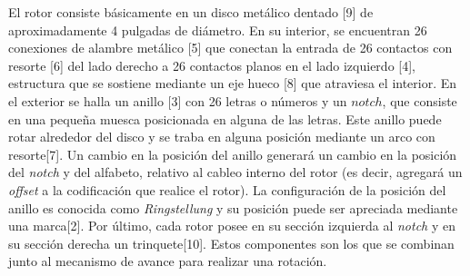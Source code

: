 \documentclass[a4paper,10pt]{article}
\begin{document}
El rotor consiste básicamente en un disco metálico dentado [9] de aproximadamente 4 pulgadas de diámetro. En su interior, se encuentran 26 conexiones de alambre metálico [5] que conectan la entrada de 26 contactos con resorte [6] del lado derecho a 26 contactos planos en el lado izquierdo [4], estructura que se sostiene mediante un eje hueco [8] que atraviesa el interior. En el exterior se halla un anillo [3] con 26 letras o números y un $notch$, que consiste en una pequeña muesca posicionada en alguna de las letras. Este anillo puede rotar alrededor del disco y se traba en alguna posición mediante un arco con resorte[7]. Un cambio en la posición del anillo generará un cambio en la posición del \textit{notch} y del alfabeto, relativo al cableo interno del rotor (es decir, agregará un \textit{offset} a la codificación que realice el rotor). La  configuración de la posición del anillo es conocida como \textit{Ringstellung} y su posición puede ser apreciada mediante una marca[2]. Por último, cada rotor posee en su sección izquierda al \textit{notch} y en su sección derecha un trinquete[10]. Estos componentes son los que se combinan junto al mecanismo de avance para realizar una rotación.
\end{document}
